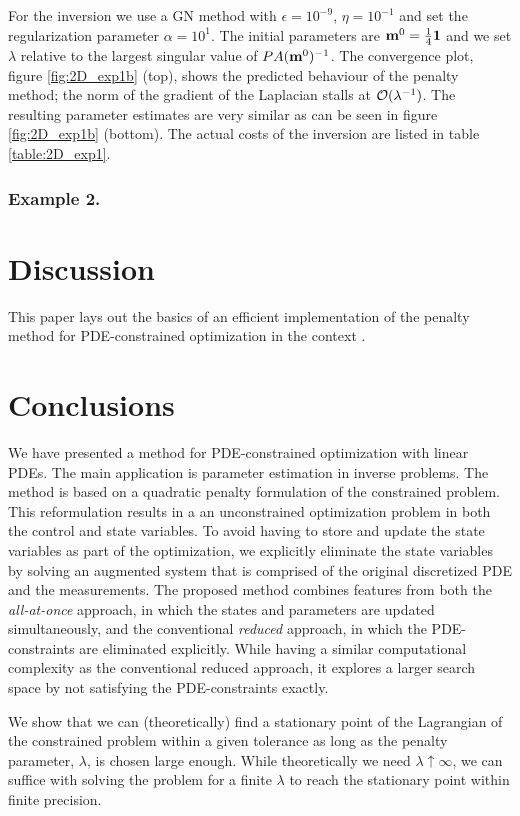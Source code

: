 \documentclass{iopart}
\begin{document}
For the inversion we use a GN method with $\epsilon=10^{-9}$, $\eta=10^{-1}$ and set the regularization parameter $\alpha = 10^{1}$.
The initial parameters are $\mathbf{m}^0 = \frac{1}{4}\mathbf{1}$ and we set $\lambda$ relative to the largest singular value of $PA(\mathbf{m}^0)^{-1}$.
The convergence plot, figure \ref{fig:2D_exp1b} (top), shows the predicted behaviour 
of the penalty method; the norm of the gradient of the Laplacian stalls at $\mathcal{O}(\lambda^{-1})$. 
The resulting parameter estimates are very similar as can be seen 
in figure \ref{fig:2D_exp1b} (bottom). The actual costs of the inversion are listed in table \ref{table:2D_exp1}.

\subsubsection{Example 2.}


\section{Discussion}
\label{discussion}
This paper lays out the basics of an efficient implementation of the
penalty method for PDE-constrained optimization in the context . 

\section{Conclusions}
\label{conclusion}
We have presented a method for PDE-constrained optimization with linear PDEs. The main application
is parameter estimation in inverse problems.
The method is based on a quadratic penalty formulation of the constrained problem. This reformulation
results in a an unconstrained optimization problem in both the control and state variables.
To avoid having to store and update the state variables as part of the optimization, we explicitly eliminate
the state variables by solving an augmented system that is comprised of the original discretized PDE and the measurements. 
The proposed method combines features from both the \emph{all-at-once}
approach, in which the states and parameters are updated simultaneously, and
the conventional \emph{reduced} approach, in which the PDE-constraints are eliminated explicitly.
While having a similar computational complexity as the conventional reduced approach, it explores
a larger search space by not satisfying the PDE-constraints exactly. 

We show that we can (theoretically)
find a stationary point of the Lagrangian of the constrained problem within a given tolerance as long as the penalty parameter, $\lambda$,
is chosen large enough. While theoretically we need $\lambda \uparrow \infty$, we can suffice with solving the problem
for a finite $\lambda$ to reach the stationary point within finite precision. 
\end{document}
